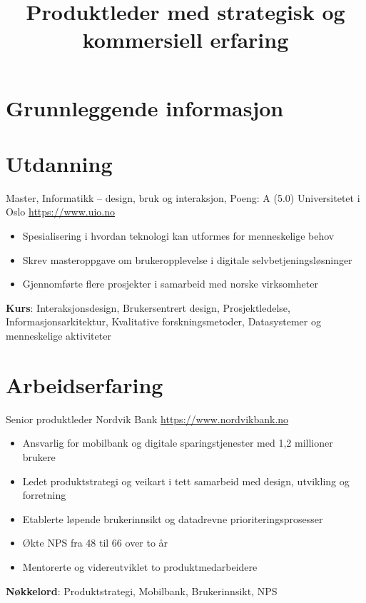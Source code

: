 \documentclass[a4paper, serif, 10pt]{moderncv}
\title{Produktleder med strategisk og kommersiell erfaring}
\begin{document}
\maketitle

\section{Grunnleggende informasjon}

\section{Utdanning}

        {Master, Informatikk – design, bruk og interaksjon, Poeng: A (5.0)}
        {Universitetet i Oslo}
        {\url{https://www.uio.no}}
        {}
        {\begin{itemize}
\item Spesialisering i hvordan teknologi kan utformes for menneskelige behov
\item Skrev masteroppgave om brukeropplevelse i digitale selvbetjeningsløsninger
\item Gjennomførte flere prosjekter i samarbeid med norske virksomheter
\end{itemize}
\textbf{Kurs}: Interaksjonsdesign, Brukersentrert design, Prosjektledelse, Informasjonsarkitektur, Kvalitative forskningsmetoder, Datasystemer og menneskelige aktiviteter}
\section{Arbeidserfaring}

        {Senior produktleder}
        {Nordvik Bank}
        {\url{https://www.nordvikbank.no}}
        {}
        {\begin{itemize}
\item Ansvarlig for mobilbank og digitale sparingstjenester med 1,2 millioner brukere
\item Ledet produktstrategi og veikart i tett samarbeid med design, utvikling og forretning
\item Etablerte løpende brukerinnsikt og datadrevne prioriteringsprosesser
\item Økte NPS fra 48 til 66 over to år
\item Mentorerte og videreutviklet to produktmedarbeidere
\end{itemize}
\textbf{Nøkkelord}: Produktstrategi, Mobilbank, Brukerinnsikt, NPS}
\end{document}
